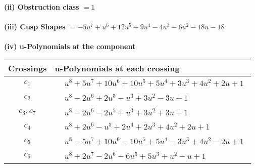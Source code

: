 \documentclass[1p]{elsarticle_modified}
\theoremstyle{definition}
\begin{document}
\flushleft \textbf{(ii) Obstruction class $= 1$}\\~\\
\flushleft \textbf{(iii) Cusp Shapes $= -5 u^7+u^6+12 u^5+9 u^4-4 u^3-6 u^2-18 u-18$}\\~\\
\newpage\renewcommand{\arraystretch}{1}
\flushleft \textbf{(iv) u-Polynomials at the component}\newline \\
\begin{tabular}{m{50pt}|m{274pt}}
Crossings & \hspace{64pt}u-Polynomials at each crossing \\
\hline $$\begin{aligned}c_{1}\end{aligned}$$&$\begin{aligned}
&u^8+5 u^7+10 u^6+10 u^5+5 u^4+3 u^3+4 u^2+2 u+1
\end{aligned}$\\
\hline $$\begin{aligned}c_{2}\end{aligned}$$&$\begin{aligned}
&u^8-2 u^6+2 u^5- u^3+3 u^2-3 u+1
\end{aligned}$\\
\hline $$\begin{aligned}c_{3},c_{7}\end{aligned}$$&$\begin{aligned}
&u^8-2 u^6-2 u^5+u^3+3 u^2+3 u+1
\end{aligned}$\\
\hline $$\begin{aligned}c_{4}\end{aligned}$$&$\begin{aligned}
&u^8+2 u^6- u^5+2 u^4+2 u^3+4 u^2+2 u+1
\end{aligned}$\\
\hline $$\begin{aligned}c_{5}\end{aligned}$$&$\begin{aligned}
&u^8-5 u^7+10 u^6-10 u^5+5 u^4-3 u^3+4 u^2-2 u+1
\end{aligned}$\\
\hline $$\begin{aligned}c_{6}\end{aligned}$$&$\begin{aligned}
&u^8+2 u^7-2 u^6-6 u^5+5 u^3+u^2- u+1
\end{aligned}$\\

\end{tabular}
\end{document}
